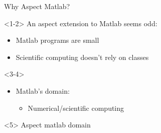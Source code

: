 \begin{frame}{Why Aspect Matlab?}
  \begin{onlyenv}<1-2>
    An aspect extension to Matlab seems odd:
    \begin{itemize}
    \item Matlab programs are small %
    \item Scientific computing doesn't rely on classes
    \end{itemize}
  \end{onlyenv}
  \begin{onlyenv}<3-4>
    \begin{itemize}
    \item Matlab's domain:
      \begin{itemize}
      \item Numerical/scientific computing
      \end{itemize}
    \end{itemize}
  \end{onlyenv}
  \begin{onlyenv}<5>
    Aspect matlab domain
    \begin{itemize}

\end{itemize}
\end{onlyenv}
\end{frame}
